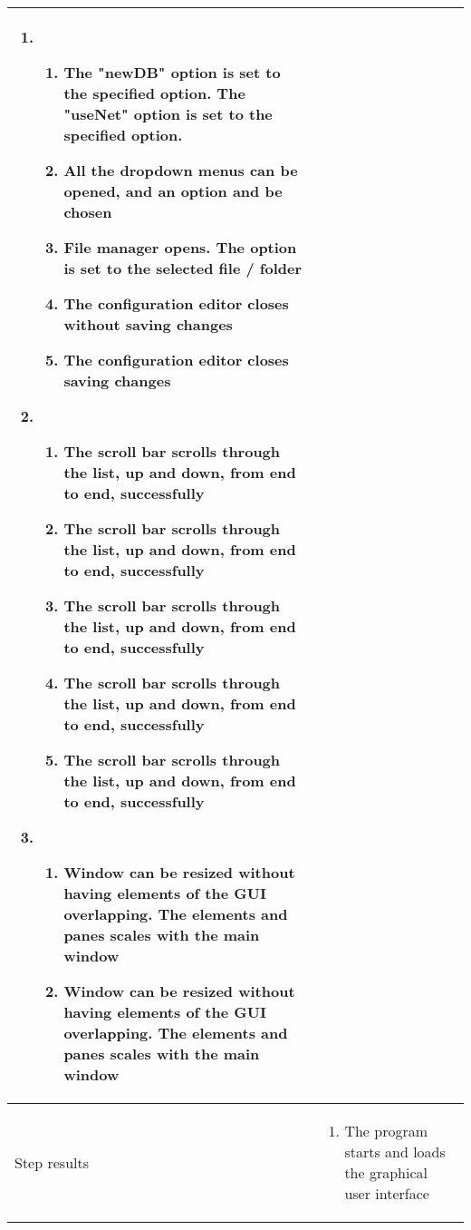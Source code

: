 \begin{center}
\begin{longtable}{ | p{4cm} | p{10cm} | }
\begin{enumerate}
							\item
							\begin{enumerate}
								\item The "newDB" option is set to the specified option. The "useNet" option is set to the specified option.
								\item All the dropdown menus can be opened, and an option and be chosen
								\item File manager opens. The option is set to the selected file / folder
								\item The configuration editor closes without saving changes
								\item The configuration editor closes saving changes
							\end{enumerate}

							\item 
							\begin{enumerate}
								\item The scroll bar scrolls through the list, up and down, from end to end, successfully
								\item The scroll bar scrolls through the list, up and down, from end to end, successfully
								\item The scroll bar scrolls through the list, up and down, from end to end, successfully
								\item The scroll bar scrolls through the list, up and down, from end to end, successfully									
								\item The scroll bar scrolls through the list, up and down, from end to end, successfully
							\end{enumerate}

							\item 
							\begin{enumerate}
								\item Window can be resized without having elements of the GUI overlapping. The elements and panes scales with the main window
								\item Window can be resized without having elements of the GUI overlapping. The elements and panes scales with the main window
							\end{enumerate}
						\end{enumerate}
							 \\  [3pt] \hline

			Step results & 	\begin{enumerate}
							\item The program starts and loads the graphical user interface


\end{enumerate}
\end{longtable}
\end{center}
